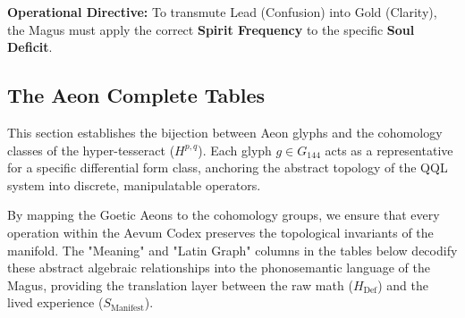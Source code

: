 \documentclass[11pt, letterpaper]{article}
\begin{document}
\vspace{1em}
\noindent \textbf{Operational Directive:} To transmute Lead (Confusion) into Gold (Clarity), the Magus must apply the correct \textbf{Spirit Frequency} to the specific \textbf{Soul Deficit}.

\newpage
\subsection{The Aeon Complete Tables}\label{sec:15.5}

This section establishes the bijection between Aeon glyphs and the cohomology classes of the hyper-tesseract ($H^{p,q}$). Each glyph $g \in G_{144}$ acts as a representative for a specific differential form class, anchoring the abstract topology of the QQL system into discrete, manipulatable operators.

By mapping the Goetic Aeons to the cohomology groups, we ensure that every operation within the Aevum Codex preserves the topological invariants of the manifold. The "Meaning" and "Latin Graph" columns in the tables below decodify these abstract algebraic relationships into the phonosemantic language of the Magus, providing the translation layer between the raw math ($H_{\text{Def}}$) and the lived experience ($S_{\text{Manifest}}$).
\end{document}
